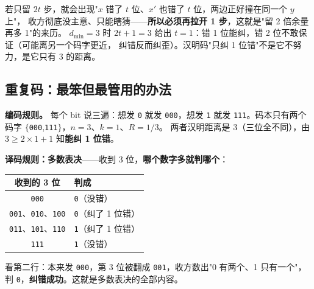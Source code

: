 若只留 $2t$ 步，就会出现"$x$ 错了 $t$ 位、$x'$ 也错了 $t$ 位，两边正好撞在同一个 $y$ 上"，
收方彻底没主意、只能瞎猜——\textbf{所以必须再拉开 1 步}，这就是"留 2 倍余量再多 1"的来历。
$d_{\min}=3$ 时 $2t+1=3$ 给出 $t=1$：错 1 位能纠，错 2 位不敢保证（可能离另一个码字更近，
纠错反而纠歪）。汉明码"只纠 1 位错"不是它不努力，是它只有 3 的距离。

\subsection{重复码：最笨但最管用的办法}

\textbf{编码规则。} 每个 bit 说三遍：想发 \texttt{0} 就发 \texttt{000}，想发 \texttt{1} 就发
\texttt{111}。码本只有两个码字 $\{$\texttt{000},\texttt{111}$\}$，$n=3$、$k=1$、$R=1/3$。
两者汉明距离是 3（三位全不同），由 $3\ge 2\times1+1$ 知\textbf{能纠 1 位错}。

\textbf{译码规则：多数表决}——收到 3 位，\textbf{哪个数字多就判哪个}：

\begin{center}\small
\setlength{\tabcolsep}{6pt}
\begin{tabular}{@{}cl@{}}
\toprule
收到的 3 位 & 判成\\
\midrule
\texttt{000} & \texttt{0}（没错）\\
\texttt{001}、\texttt{010}、\texttt{100} & \texttt{0}（纠了 1 位错）\\
\texttt{011}、\texttt{101}、\texttt{110} & \texttt{1}（纠了 1 位错）\\
\texttt{111} & \texttt{1}（没错）\\
\bottomrule
\end{tabular}
\end{center}

看第二行：本来发 \texttt{000}，第 3 位被翻成 \texttt{001}，收方数出"0 有两个、1 只有一个"，
判 \texttt{0}，\textbf{纠错成功}。这就是多数表决的全部内容。

